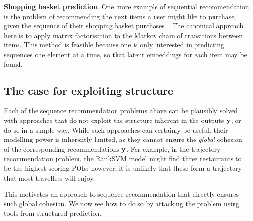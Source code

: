 %
\textbf{Shopping basket prediction}.
One more example of sequential recommendation is the problem of recommending the next items a user might like to purchase, given the sequence of their shopping basket purchases~\citep{Rendle:2010,Wang:2015}.
The canonical approach here is to apply matrix factorisation to the Markov chain of transitions between items.
This method is feasible because one is only interested in predicting sequences one element at a time, so that latent embeddings for each item may be found.


%
\subsection{The case for exploiting structure}

Each of the sequence recommendation problems above can be plausibly solved with approaches that do not exploit the structure inherent in the outputs $\mathbf{y}$, or do so in a simple way.
While such approaches can certainly be useful,
their modelling power is inherently limited,
as
they cannot ensure the \emph{global} cohesion of the corresponding recommendations $\mathbf{y}$.
For example, in the trajectory recommendation problem, the RankSVM model %
might find three restaurants to be the highest scoring POIs;
however, it is unlikely that these form a trajectory that most travellers will enjoy.

This motivates an approach to sequence recommendation that directly ensures such global cohesion.
We now see how to do so by attacking the problem using tools from structured prediction.



%

